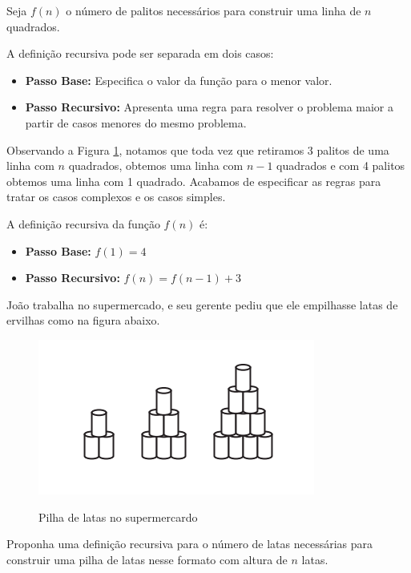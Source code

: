 Seja $f(n)$ o número de palitos necessários para construir uma linha de $n$ quadrados.

A definição recursiva pode ser separada em dois casos:

\begin{itemize}
    \item \textbf{Passo Base:} Especifica o valor da função para o menor valor.
    \item \textbf{Passo Recursivo:} Apresenta uma regra para resolver o problema maior a partir de casos menores do mesmo problema.
\end{itemize}

Observando a Figura \ref{fig::palitos}, notamos que toda vez que retiramos 3 palitos de uma linha com $n$ quadrados, obtemos uma linha com $n-1$ quadrados e com 4 palitos obtemos uma linha com 1 quadrado. Acabamos de especificar as regras para tratar os casos complexos e os casos simples.

A definição recursiva da função $f(n)$ é:

\begin{itemize}
    \item \textbf{Passo Base:} $f(1) = 4$
    \item \textbf{Passo Recursivo:} $f(n) = f(n-1) + 3$
\end{itemize}

\begin{exemplo}
João trabalha no supermercado, e seu gerente pediu que ele empilhasse latas de ervilhas como na figura abaixo.


\begin{figure}[htbp]
\centering
\includegraphics[width=.9\textwidth]{images/Latas.png}
\label{fig::palitos}
\caption{Pilha de latas no supermercardo}
\end{figure}


Proponha uma definição recursiva para o número de latas necessárias para construir uma pilha de latas nesse formato com altura de $n$ latas. 
\end{exemplo}

